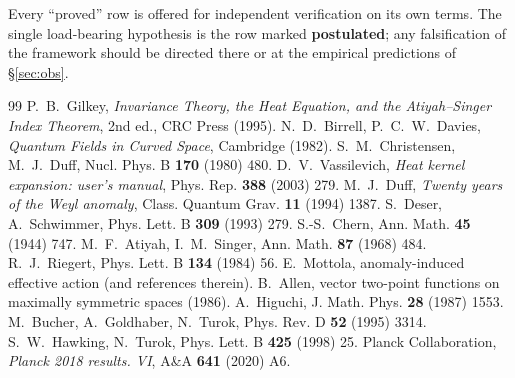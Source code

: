 \documentclass[11pt,a4paper]{article}
\theoremstyle{definition}
\theoremstyle{remark}
\begin{document}
\noindent
Every ``proved'' row is offered for independent verification on its own terms. The single
load-bearing hypothesis is the row marked \textbf{postulated}; any falsification of the framework
should be directed there or at the empirical predictions of \S\ref{sec:obs}.

\begin{thebibliography}{99}
 P.~B.~Gilkey, \emph{Invariance Theory, the Heat Equation, and the
Atiyah--Singer Index Theorem}, 2nd ed., CRC Press (1995).
 N.~D.~Birrell, P.~C.~W.~Davies, \emph{Quantum Fields in Curved Space},
Cambridge (1982).
 S.~M.~Christensen, M.~J.~Duff, Nucl. Phys. B \textbf{170} (1980) 480.
 D.~V.~Vassilevich, \emph{Heat kernel expansion: user's manual}, Phys.
Rep. \textbf{388} (2003) 279.
 M.~J.~Duff, \emph{Twenty years of the Weyl anomaly}, Class. Quantum Grav.
\textbf{11} (1994) 1387.
 S.~Deser, A.~Schwimmer, Phys. Lett. B \textbf{309} (1993) 279.
 S.-S.~Chern, Ann. Math. \textbf{45} (1944) 747.
 M.~F.~Atiyah, I.~M.~Singer, Ann. Math. \textbf{87} (1968) 484.
 R.~J.~Riegert, Phys. Lett. B \textbf{134} (1984) 56.
 E.~Mottola, anomaly-induced effective action (and references therein).
 B.~Allen, vector two-point functions on maximally symmetric spaces (1986).
 A.~Higuchi, J. Math. Phys. \textbf{28} (1987) 1553.
 M.~Bucher, A.~Goldhaber, N.~Turok, Phys. Rev. D \textbf{52} (1995) 3314.
 S.~W.~Hawking, N.~Turok, Phys. Lett. B \textbf{425} (1998) 25.
 Planck Collaboration, \emph{Planck 2018 results. VI}, A\&A \textbf{641} (2020) A6.
\end{thebibliography}
\end{document}
